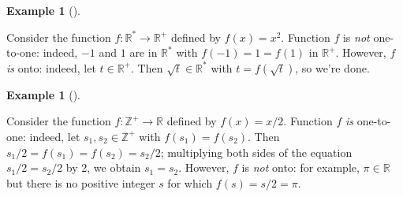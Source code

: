 \documentclass[10pt,]{book}
\theoremstyle{plain}
\theoremstyle{definition}
\theoremstyle{definition}
\theoremstyle{definition}
\newtheorem{example}[theorem]{Example}
\theoremstyle{definition}
\numberwithin{equation}{section}
\def\Z{\mathbb{Z}}
\def\R{\mathbb{R}}
\begin{document}
\begin{example}[]\label{example-6}

        Consider the function \(f: \R^* \to \R^+\) defined by \(f(x)=x^2\). Function \(f\) is \emph{not} one-to-one: indeed,
        \(-1\) and \(1\) are in \(\R^*\) with \(f(-1)=1=f(1)\) in \(\R^+\).
        However, \(f\) \emph{is} onto: indeed, let \(t\in \R^+\). Then
        \(\sqrt{t} \in \R^*\) with \(t=f(\sqrt{t})\), so we're done.
\end{example}
\begin{example}[]\label{example-7}

        Consider the function \(f: \Z^+ \to \R\) defined by \(f(x)=x/2\). Function \(f\) \emph{is} one-to-one: indeed, let \(s_1, s_2 \in \Z^+\) with \(f(s_1)=f(s_2)\).
        Then \(s_1/2=f(s_1)=f(s_2)=s_2/2\); multiplying both sides of the equation \(s_1/2=s_2/2\) by 2, we obtain \(s_1=s_2\). However, \(f\) is \emph{not} onto: for example, \(\pi\in \R\)
        but there is no positive integer \(s\) for which \(f(s)=s/2=\pi\).
\end{example}
\par
\end{document}
